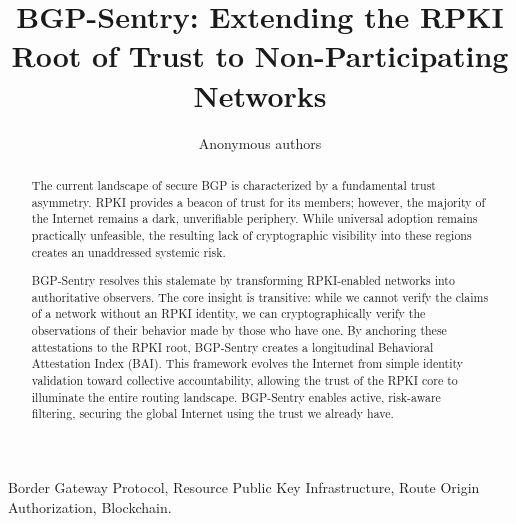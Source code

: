 \documentclass[conference]{IEEEtran}
\begin{document}

\title{BGP-Sentry: Extending the RPKI Root of Trust to Non-Participating Networks}
\author{Anonymous authors}


\maketitle

\begin{abstract}
The current landscape of secure BGP is characterized by a fundamental trust asymmetry. RPKI provides a beacon of trust for its members; however, the majority of the Internet remains a dark, unverifiable periphery. While universal adoption remains practically unfeasible, the resulting lack of cryptographic visibility into these regions creates an unaddressed systemic risk.

BGP-Sentry resolves this stalemate by transforming RPKI-enabled networks into authoritative observers. The core insight is transitive: while we cannot verify the claims of a network without an RPKI identity, we can cryptographically verify the observations of their behavior made by those who have one. By anchoring these attestations to the RPKI root, BGP-Sentry creates a longitudinal Behavioral Attestation Index (BAI). This framework evolves the Internet from simple identity validation toward collective accountability, allowing the trust of the RPKI core to illuminate the entire routing landscape. BGP-Sentry enables active, risk-aware filtering, securing the global Internet using the trust we already have.
\end{abstract}

\begin{IEEEkeywords}
Border Gateway Protocol, Resource Public Key Infrastructure, Route Origin Authorization, Blockchain.
\end{IEEEkeywords}

\IEEEpeerreviewmaketitle

\end{document}
